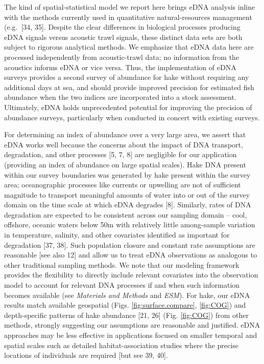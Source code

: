 \documentclass[
]{article}
\begin{document}
The kind of spatial-statistical model we report here brings eDNA analysis 
inline with the methods currently used in quantitative natural-resources management
(e.g.~{[}34, 35{]}. Despite the clear differences in biological processes
producing eDNA signals versus acoustic trawl signals, these
distinct data sets are both subject to rigorous analytical methods. We
emphasize that eDNA data here are processed independently from
acoustic-trawl data; no information from the acoustics informs eDNA or
vice versa. Thus, the implementation of eDNA surveys provides a second
survey of abundance for hake without requiring any additional days at
sea, and should provide improved precision for estimated 
fish abundance when the two indices are
incorporated into a stock assessment. Ultimately, eDNA holds
unprecedented potential for improving the precision of abundance
surveys, particularly when conducted in concert with existing surveys.

For determining an index of abundance over a very large area, we assert
that eDNA works well because the concerns about the impact of DNA
transport, degradation, and other processes {[}5, 7, 8{]} are negligible for
our application (providing an index of abundance on large spatial
scales). Hake DNA present within our survey boundaries was generated by
hake present within the survey area; oceanographic processes like
currents or upwelling are not of sufficient magnitude to transport
meaningful amounts of water into or out of the survey domain on the time
scale at which eDNA degrades {[}8{]}. Similarly, rates of DNA degradation
are expected to be consistent across our sampling domain -- cool,
offshore, oceanic waters below 50m with relatively little among-sample
variation in temperature, salinity, and other covariates identified as
important for degradation {[}37, 38{]}. Such population closure and constant
rate assumptions are reasonable {[}see also 12{]} and allow us to treat
eDNA observations as analogous to other traditional sampling methods. We
note that our modeling framework provides the flexibility to directly
include relevant covariates into the observation model to account for
relevant DNA processes if and when such information becomes available
(see \emph{Materials and Methods} and \emph{ESM}). For hake, our eDNA
results match available geospatial (Figs. \ref{fig:surface.compare},
\ref{fig:COG}) and depth-specific patterns of hake abundance {[}21, 26{]} (Fig. \ref{fig:COG}) 
from other methods, strongly suggesting our
assumptions are reasonable and justified. eDNA approaches may be less
effective in applications focused on smaller temporal and spatial scales
such as detailed habitat-association studies where the precise locations
of individuals are required {[}but see 39, 40{]}.
\end{document}

